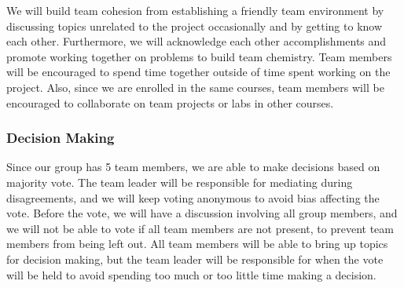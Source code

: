 \documentclass{article}
\begin{document}
We will build team cohesion from establishing a friendly team environment by discussing topics unrelated to the project occasionally and by getting to know each other. Furthermore, we will acknowledge 
each other accomplishments and promote working together on problems to build team chemistry. Team members will be encouraged to spend time together outside of time spent working on the project. Also, since we 
are enrolled in the same courses, team members will be encouraged to collaborate on team projects or labs in other courses. 

\subsubsection*{Decision Making} 

Since our group has 5 team members, we are able to make decisions based on majority vote. The team leader will be responsible for mediating during disagreements, and we will keep voting anonymous to avoid bias 
affecting the vote. Before the vote, we will have a discussion involving all group members, and we will not be able to vote if all team members are not present, to prevent team members from being left out. 
All team members will be able to bring up topics for decision making, but the team leader will be responsible for when the vote will be held to avoid spending too much or too little time making a decision.
\end{document}
